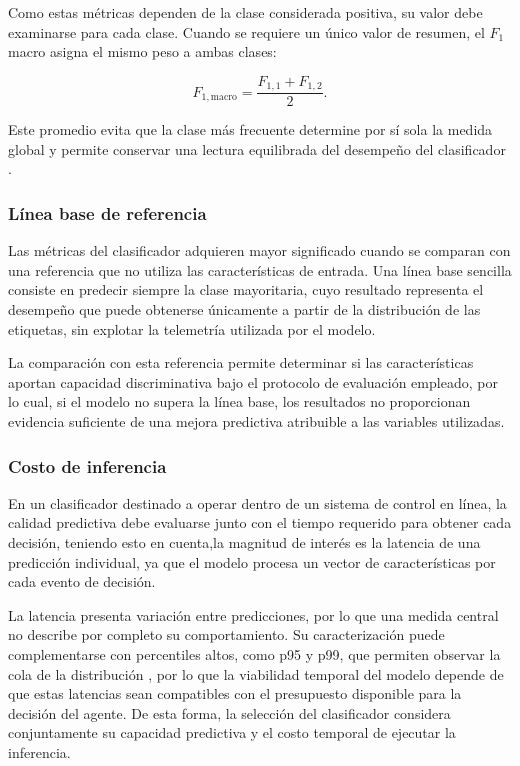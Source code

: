 Como estas métricas dependen de la clase considerada positiva, su valor debe
examinarse para cada clase. Cuando se requiere un único valor de resumen, el
$F_1$ macro asigna el mismo peso a ambas clases:

\begin{equation}
    F_{1,\mathrm{macro}}
    =
    \frac{F_{1,1}+F_{1,2}}{2}.
\end{equation}

Este promedio evita que la clase más frecuente determine por sí sola la
medida global y permite conservar una lectura equilibrada del desempeño del
clasificador \cite{SokolovaLapalme2009}.

\subsubsection{Línea base de referencia}
\label{sec:marco-lineas-base}

Las métricas del clasificador adquieren mayor significado cuando se comparan
con una referencia que no utiliza las características de entrada. Una línea
base sencilla consiste en predecir siempre la clase mayoritaria, cuyo resultado
representa el desempeño que puede obtenerse únicamente a partir de la
distribución de las etiquetas, sin explotar la telemetría utilizada por el
modelo.

La comparación con esta referencia permite determinar si las características
aportan capacidad discriminativa bajo el protocolo de evaluación empleado, por lo cual, si el modelo no supera la línea base, los resultados no proporcionan evidencia
suficiente de una mejora predictiva atribuible a las variables utilizadas.

\subsubsection{Costo de inferencia}
\label{sec:marco-costo-inferencia}

En un clasificador destinado a operar dentro de un sistema de control en
línea, la calidad predictiva debe evaluarse junto con el tiempo requerido para
obtener cada decisión, teniendo esto en cuenta,la magnitud de interés es la latencia de una predicción
individual, ya que el modelo procesa un vector de características por cada
evento de decisión.

La latencia presenta variación entre predicciones, por lo que una medida
central no describe por completo su comportamiento. Su caracterización puede
complementarse con percentiles altos, como p95 y p99, que permiten observar la
cola de la distribución \cite{Georges2007}, por lo que la viabilidad temporal del modelo
depende de que estas latencias sean compatibles con el presupuesto disponible
para la decisión del agente. De esta forma, la selección del clasificador
considera conjuntamente su capacidad predictiva y el costo temporal de
ejecutar la inferencia.

